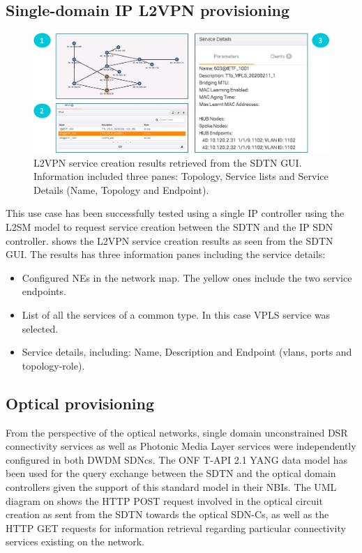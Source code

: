 \documentclass[a4paper,fleqn]{cas-dc}
\begin{document}
\subsection{Single-domain IP L2VPN provisioning}

\begin{figure}
	\centering
		\includegraphics[width=\linewidth]{figs/l2vpn_results.png}
	\caption{L2VPN service creation results retrieved from the SDTN GUI. Information included three panes: Topology, Service lists and Service Details (Name, Topology and Endpoint).}
	\label{FIG:L2SM_results}
\end{figure}

This use case has been successfully tested using a single IP controller using the L2SM model to request service creation between the SDTN and the IP SDN controller.  shows the L2VPN service creation results as seen from the SDTN GUI. The results has three information panes including the service details: 
\begin{itemize}
    \item Configured NEs in the network map. The yellow ones include the two service endpoints.
    \item List of all the services of a common type. In this case VPLS service was selected. 
    \item Service details, including: Name, Description and Endpoint (vlans, ports and topology-role). 
\end{itemize}

\subsection{Optical provisioning}
From the perspective of the optical networks, single domain unconstrained DSR connectivity services as well as Photonic Media Layer services were independently configured in both DWDM SDNcs. The ONF T-API 2.1 YANG data model has been used for the query exchange between the SDTN and the optical domain controllers given the support of this standard model in their NBIs. The UML diagram on  shows the HTTP POST request involved in the optical circuit creation as sent from the SDTN towards the optical SDN-Cs, as well as the HTTP GET requests for information retrieval regarding particular connectivity services existing on the network. 
\end{document}
